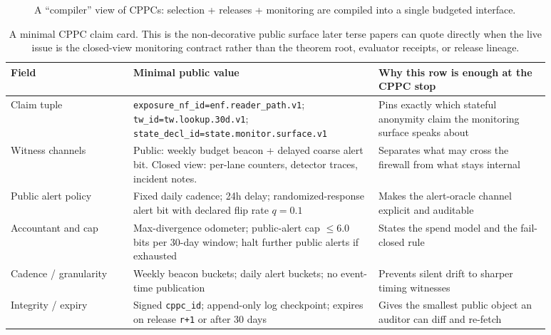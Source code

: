 \documentclass[11pt]{article}
\begin{document}
\begin{figure}[t]
  \centering
  \caption{A ``compiler'' view of CPPCs: selection + releases + monitoring are compiled into a single budgeted interface.}
\end{figure}

\begin{table}[t]
\centering\small
\begin{tabular}{@{}p{0.20\linewidth}p{0.40\linewidth}p{0.28\linewidth}@{}}
\toprule
Field & Minimal public value & Why this row is enough at the CPPC stop \\
\midrule
Claim tuple & \texttt{exposure\_nf\_id=enf.reader\_path.v1}; \texttt{tw\_id=tw.lookup.30d.v1}; \texttt{state\_decl\_id=state.monitor.surface.v1} & Pins exactly which stateful anonymity claim the monitoring surface speaks about \\
Witness channels & Public: weekly budget beacon + delayed coarse alert bit. Closed view: per-lane counters, detector traces, incident notes. & Separates what may cross the firewall from what stays internal \\
Public alert policy & Fixed daily cadence; 24h delay; randomized-response alert bit with declared flip rate \(q=0.1\) & Makes the alert-oracle channel explicit and auditable \\
Accountant and cap & Max-divergence odometer; public-alert cap \(\le 6.0\) bits per 30-day window; halt further public alerts if exhausted & States the spend model and the fail-closed rule \\
Cadence / granularity & Weekly beacon buckets; daily alert buckets; no event-time publication & Prevents silent drift to sharper timing witnesses \\
Integrity / expiry & Signed \texttt{cppc\_id}; append-only log checkpoint; expires on release \texttt{r+1} or after 30 days & Gives the smallest public object an auditor can diff and re-fetch \\
\bottomrule
\end{tabular}
\caption{A minimal CPPC claim card. This is the non-decorative public surface later terse papers can quote directly when the live issue is the closed-view monitoring contract rather than the theorem root, evaluator receipts, or release lineage.}
\label{tab:minimal-cppc-card}
\end{table}
\end{document}
